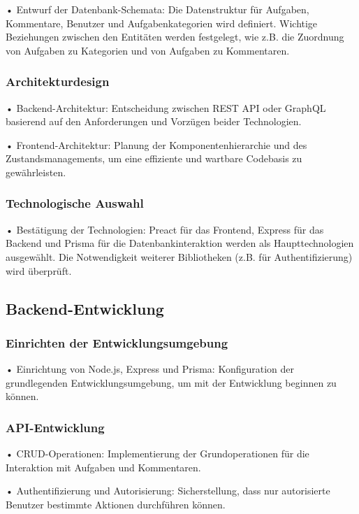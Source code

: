 \documentclass[12pt,a4paper]{article} %
\begin{document}
•	Entwurf der Datenbank-Schemata: Die Datenstruktur für Aufgaben, Kommentare, Benutzer und Aufgabenkategorien wird definiert. Wichtige Beziehungen zwischen den Entitäten werden festgelegt, wie z.B. die Zuordnung von Aufgaben zu Kategorien und von Aufgaben zu Kommentaren.

\subsubsection*{Architekturdesign}

•	Backend-Architektur: Entscheidung zwischen REST API oder GraphQL basierend auf den Anforderungen und Vorzügen beider Technologien.

•	Frontend-Architektur: Planung der Komponentenhierarchie und des Zustandsmanagements, um eine effiziente und wartbare Codebasis zu 
gewährleisten.

\subsubsection*{Technologische Auswahl}

•	Bestätigung der Technologien: Preact für das Frontend, Express für das Backend und Prisma für die Datenbankinteraktion werden als Haupttechnologien ausgewählt. Die Notwendigkeit weiterer Bibliotheken (z.B. für Authentifizierung) wird überprüft.

\subsection{Backend-Entwicklung}

\subsubsection*{Einrichten der Entwicklungsumgebung}

•	Einrichtung von Node.js, Express und Prisma: Konfiguration der grundlegenden Entwicklungsumgebung, um mit der Entwicklung beginnen 
zu können.

\subsubsection*{ API-Entwicklung}

•	    CRUD-Operationen: Implementierung der Grundoperationen für die Interaktion mit Aufgaben und Kommentaren.

•	    Authentifizierung und Autorisierung: Sicherstellung, dass nur autorisierte Benutzer bestimmte Aktionen durchführen können.
\end{document}
